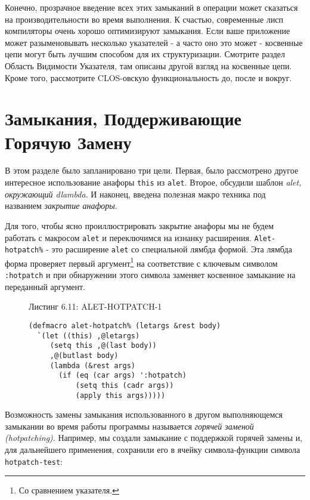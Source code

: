 Конечно, прозрачное введение всех этих замыканий в операции может сказаться на производительности во время выполнения. К счастью, современные лисп компиляторы очень хорошо оптимизируют замыкания. Если ваше приложение может разыменовывать несколько указателей - а часто оно это может - косвенные цепи могут быть лучшим способом для их структуризации. Смотрите раздел Область Видимости Указателя, там описаны другой взгляд на косвенные цепи. Кроме того, рассмотрите CLOS-овскую функциональность до, после и вокруг.

\section{Замыкания, Поддерживающие Горячую Замену}\label{section_hotpatching_closures}


В этом разделе было запланировано три цели. Первая, было рассмотрено другое интересное использование анафоры \verb"this" из \verb"alet". Второе, обсудили шаблон \emph{alet, окружающий dlambda}. И наконец, введена полезная макро техника под названием \emph{закрытие анафоры}.

Для того, чтобы ясно проиллюстрировать закрытие анафоры мы не будем работать с макросом \verb"alet" и переключимся на изнанку расширения. \verb"Alet-hotpatch%" - это расширение \verb"alet" со специальной лямбда формой. Эта лямбда форма проверяет первый аргумент\footnote{Со сравнением указателя.} на соответствие с ключевым символом \verb":hotpatch" и при обнаружении этого символа заменяет косвенное замыкание на переданный аргумент.



\begin{figure}Листинг 6.11: ALET-HOTPATCH-1\label{listing_6.11}
\listbegin
\begin{verbatim}
(defmacro alet-hotpatch% (letargs &rest body)
  `(let ((this) ,@letargs)
     (setq this ,@(last body))
     ,@(butlast body)
     (lambda (&rest args)
       (if (eq (car args) ':hotpatch)
           (setq this (cadr args))
           (apply this args)))))
\end{verbatim}
\listend
\end{figure}

Возможность замены замыкания использованного в другом выполняющемся замыкании во время работы программы называется \emph{горячей заменой (hotpatching)}. Например, мы создали замыкание с поддержкой горячей замены и, для дальнейшего применения, сохранили его в ячейку символа-функции символа \verb"hotpatch-test":

